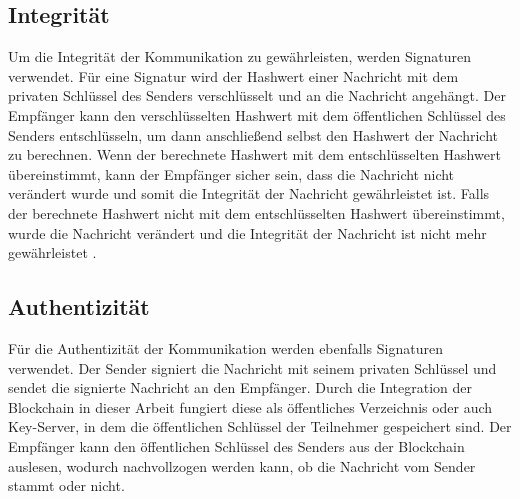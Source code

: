 
\subsection{Integrität}

Um die Integrität der Kommunikation zu gewährleisten, werden Signaturen verwendet. Für eine Signatur wird der Hashwert einer Nachricht mit dem privaten Schlüssel des Senders verschlüsselt und an die Nachricht angehängt. Der Empfänger kann den verschlüsselten Hashwert mit dem öffentlichen Schlüssel des Senders entschlüsseln, um dann anschließend selbst den Hashwert der Nachricht zu berechnen. Wenn der berechnete Hashwert mit dem entschlüsselten Hashwert übereinstimmt, kann der Empfänger sicher sein, dass die Nachricht nicht verändert wurde und somit die Integrität der Nachricht gewährleistet ist. Falls der berechnete Hashwert nicht mit dem entschlüsselten Hashwert übereinstimmt, wurde die Nachricht verändert und die Integrität der Nachricht ist nicht mehr gewährleistet \Parencite[S. 73-78]{Hellmann_IT-Sicherheit}.


\subsection{Authentizität}

Für die Authentizität der Kommunikation werden ebenfalls Signaturen verwendet. Der Sender signiert die Nachricht mit seinem privaten Schlüssel und sendet die signierte Nachricht an den Empfänger. Durch die Integration der Blockchain in dieser Arbeit fungiert diese als öffentliches Verzeichnis oder auch Key-Server, in dem die öffentlichen Schlüssel der Teilnehmer gespeichert sind. Der Empfänger kann den öffentlichen Schlüssel des Senders aus der Blockchain auslesen, wodurch nachvollzogen werden kann, ob die Nachricht vom Sender stammt oder nicht.